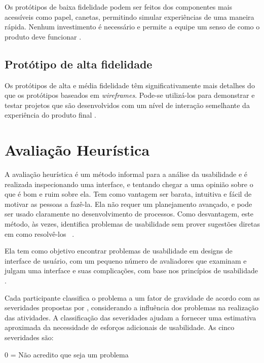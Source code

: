 Os protótipos de baixa fidelidade podem ser feitos dos componentes mais acessíveis como papel, canetas, permitindo simular experiências de uma maneira rápida. Nenhum investimento é necessário e permite a equipe um senso de como o produto deve funcionar \cite{Sommerville:2010:SE:1841764}.

\subsection{Protótipo de alta fidelidade}
Os protótipos de alta e média fidelidade têm significativamente mais detalhes do que os protótipos baseados em \textit{wireframes}. Pode-se utilizá-los para demonstrar e testar projetos que são desenvolvidos com um nível de interação semelhante da experiência do produto final \cite{Sommerville:2010:SE:1841764}.


\section{Avaliação Heurística}

A avaliação heurística é um método informal para a análise da usabilidade e é realizada inspecionando uma interface, e tentando chegar a uma opinião sobre o que é bom e ruim sobre ela. Tem como vantagem ser barata, intuitiva e fácil de motivar as pessoas a fazê-la. Ela não requer um planejamento avançado, e pode ser usado claramente no desenvolvimento de processos. Como desvantagem, este método, às vezes, identifica problemas de usabilidade sem prover sugestões diretas em como resolvê-los ~\cite{Nielsen:1990:HEU:97243.97281}.

Ela tem como objetivo encontrar problemas de usabilidade em designs de interface de usuário, com um pequeno número de avaliadores que examinam e julgam uma interface e suas complicações, com base nos princípios de usabilidade \cite{Nielsen:1992:FUP:142750.142834}.


Cada participante classifica o problema a um fator de gravidade de acordo com as severidades propostas por \cite{severidades}, considerando a influência dos problemas na realização das atividades. A classificação das severidades ajudam a fornecer uma estimativa aproximada da necessidade de esforços adicionais de usabilidade. As cinco severidades são:

  
0 = Não acredito que seja um problema

